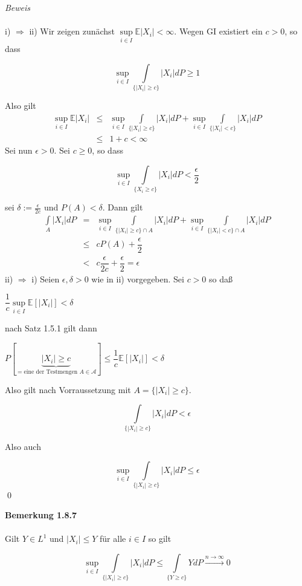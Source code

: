 \documentclass[10pt,a4paper]{report}
\newcommand{\E}{\mathbb{E}}
\numberwithin{equation}{section}
\numberwithin{figure}{section}
\theoremstyle{plain}
\theoremstyle{definition}
\theoremstyle{plain}
\theoremstyle{definition}
\theoremstyle{remark}
\theoremstyle{plain}
\begin{document}
\textit{Beweis}\\\\
i) $\Rightarrow$ ii) Wir zeigen zunächst $\sup\limits_{i \in I} \E|X_i| < \infty$. Wegen GI existiert ein $c>0$, so dass 
\begin{center}
\[\sup\limits_{i \in I} \int\limits_{\{|X_i|\geq c\}}|X_i|dP\geq 1\]
\end{center}
Also gilt
\begin{eqnarray*}
\sup\limits_{i \in I} \E|X_i| &\leq& \sup\limits_{i \in I}\int\limits_{\{|X_i|\geq c\}}|X_i|dP+ \sup\limits_{i \in I}\int\limits_{\{|X_i|< c\}}|X_i|dP\\
&\leq & 1+c < \infty 
\end{eqnarray*}
Sei nun $\epsilon >0$. Sei $c\geq 0$, so dass
\begin{center}
\[\sup\limits_{i \in I} \int\limits_{\{X_i \geq c\}}|X_i|dP <\dfrac{\epsilon}{2}\]
\end{center}
sei $ \delta:=\frac{\epsilon}{2c}$ und $P(A)<\delta$. Dann gilt
\begin{eqnarray*}
\int\limits_A|X_i|dP&=&\sup\limits_{i \in I}\int\limits_{\{|X_i|\geq c\}\cap A}|X_i|dP+ \sup\limits_{i \in I}\int\limits_{\{|X_i|< c\}\cap A}|X_i|dP\\
&\leq & cP(A)+\dfrac{\epsilon}{2}\\
&<& c\dfrac{\epsilon}{2c}+\dfrac{\epsilon}{2}=\epsilon
\end{eqnarray*}
ii) $\Rightarrow$ i) Seien $\epsilon, \delta >0 $ wie in ii) vorgegeben. Sei $c>0$ so daß
\begin{center}
$\dfrac{1}{c}\sup\limits_{i \in I} \E[|X_i|]<\delta$
\end{center}
nach Satz 1.5.1 gilt dann
\begin{center}
$P[\underbrace{|X_i|\geq c}_{= \text{eine der Testmengen } A \in \mathcal{A}}]\leq \dfrac{1}{c}\E[|X_i|]<\delta$
\end{center}
Also gilt nach Vorraussetzung mit $A=\{|X_i|\geq c\}$.
\begin{center}
\[\int\limits_{\{|X_i|\geq c\}}|X_i|dP < \epsilon\]
\end{center}
Also auch
\begin{center}
\[\sup\limits_{i \in I}\int\limits_{\{|X_i|\geq c\}}|X_i|dP \leq \epsilon \] \qed
\end{center}
\textbf{Bemerkung 1.8.7}\\\\
Gilt $Y \in L^1$ und $|X_i| \leq Y$ für alle $i \in I$ so gilt
\begin{center}
\[\sup\limits_{i \in I} \int\limits_{\{|X_i|\geq c\}}|X_i|dP \leq \int\limits_{\{Y \geq c\}}Y dP \overset{n \to \infty}{\to} 0 \]
\end{center}
\end{document}

